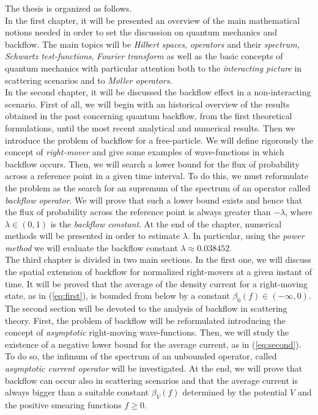 The thesis is organized as follows.\\
In the first chapter, it will be presented an overview of the main mathematical
notions needed in order to set the discussion on quantum mechanics and backflow. The main
topics will be \textit{Hilbert spaces}, \textit{operators} and their \textit{spectrum}, \textit{Schwartz test-functions}, \textit{Fourier transform} as well as the basic concepts of quantum mechanics with particular attention both to the \textit{interacting picture} in scattering scenarios and to \textit{M\o{}ller operators}. \\
In the second chapter, it will be discussed the backflow effect in a non-interacting scenario. First of all, we will begin with an historical overview of the results obtained in the past concerning quantum backflow, from the first theoretical formulations, until the most recent analytical and numerical results. Then we introduce the problem of backflow for a free-particle. We will define rigorously the concept of \textit{right-mover} and give some examples of wave-functions in which backflow occurs. Then, we will search a lower bound for the flux of probability across a reference point in a given time interval. To do this, we must reformulate the problem as the search for an supremum of the spectrum of an operator called \textit{backflow operator}. We will prove that such a lower bound exists and hence that the flux of probability across the reference point is always greater than $-\lambda$, where $\lambda\in(0,1)$ is the \textit{backflow constant}. At the end of the chapter, numerical methods will be presented in order to estimate $\lambda$. In particular, using the \textit{power method} we will evaluate the backflow constant $\lambda\approx0.038452$.\\
The third chapter is divided in two main sections. In the first one, we will discuss the spatial extension of backflow for normalized right-movers at a given instant of time. It will be proved that the average of the density current for a right-moving state, as in (\ref{eq:first}), is bounded from below by a constant $\beta_0(f)\in(-\infty,0)$. The second section will be devoted to the analysis of backflow in scattering theory. First, the problem of backflow will be reformulated introducing the concept of \textit{asymptotic} right-moving wave-functions. Then, we will study the existence of a negative lower bound for the average current, as in (\ref{eq:second}). To do so, the infimum of the spectrum of an unbounded operator, called \textit{asymptotic current operator} will be investigated. At the end, we will prove that backflow can occur also in scattering scenarios and that the average current is always bigger than a suitable constant $\beta_V(f)$ determined by the potential $V$ and the positive smearing functions $f\ge0$. 
